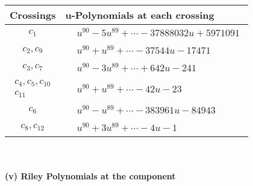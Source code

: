 \documentclass[1p]{elsarticle_modified}
\theoremstyle{definition}
\begin{document}
\begin{tabular}{m{50pt}|m{274pt}}
Crossings & \hspace{64pt}u-Polynomials at each crossing \\
\hline $$\begin{aligned}c_{1}\end{aligned}$$&$\begin{aligned}
&u^{90}-5 u^{89}+\cdots-37888032 u+5971091
\end{aligned}$\\
\hline $$\begin{aligned}c_{2},c_{9}\end{aligned}$$&$\begin{aligned}
&u^{90}+u^{89}+\cdots-37544 u-17471
\end{aligned}$\\
\hline $$\begin{aligned}c_{3},c_{7}\end{aligned}$$&$\begin{aligned}
&u^{90}-3 u^{89}+\cdots+642 u-241
\end{aligned}$\\
\hline $$\begin{aligned}c_{4},c_{5},c_{10}\\c_{11}\end{aligned}$$&$\begin{aligned}
&u^{90}+u^{89}+\cdots-42 u-23
\end{aligned}$\\
\hline $$\begin{aligned}c_{6}\end{aligned}$$&$\begin{aligned}
&u^{90}- u^{89}+\cdots-383961 u-84943
\end{aligned}$\\
\hline $$\begin{aligned}c_{8},c_{12}\end{aligned}$$&$\begin{aligned}
&u^{90}+3 u^{89}+\cdots-4 u-1
\end{aligned}$\\
\hline
\end{tabular}\\~\\
\newpage\renewcommand{\arraystretch}{1}
\flushleft \textbf{(v) Riley Polynomials at the component}\newline \\
\end{document}
